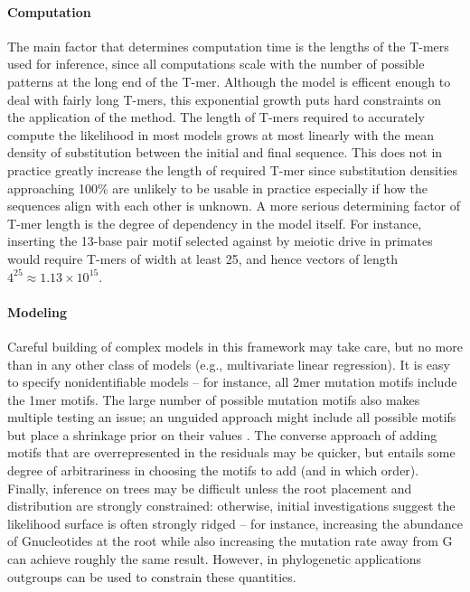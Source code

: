 \documentclass{article}
\newcommand{\nG}{\mbox{G}}
\theoremstyle{plain}
\theoremstyle{definition}
\begin{document}
\paragraph{Computation}
The main factor that determines computation time
is the lengths of the T-mers used for inference,
since all computations scale with the number of possible patterns at the long end of the T-mer.
Although the model is efficent enough to deal with fairly long T-mers,
this exponential growth puts hard constraints on the application of the method.
The length of T-mers required to accurately compute the likelihood in most models grows at most linearly
with the mean density of substitution between the initial and final sequence.
This does not in practice greatly increase the length of required T-mer 
since substitution densities approaching 100\% are unlikely to be usable in practice
especially if how the sequences align with each other is unknown.
A more serious determining factor of T-mer length is the degree of dependency in the model itself.
For instance, inserting the 13-base pair motif selected against by meiotic drive in primates \citep{myers2010drive}
would require T-mers of width at least 25, and hence vectors of length $4^25 \approx 1.13 \times 10^15$.


\paragraph{Modeling}
Careful building of complex models in this framework may take care,
but no more than in any other class of models (e.g., multivariate linear regression).
It is easy to specify nonidentifiable models -- 
for instance, all 2mer mutation motifs include the 1mer motifs.
The large number of possible mutation motifs also makes multiple testing an issue;
an unguided approach might include all possible motifs but place a shrinkage prior on their values \citep{shrinkage,horseshoe}.
The converse approach of adding motifs that are overrepresented in the residuals
may be quicker, but entails some degree of arbitrariness in choosing the motifs to add (and in which order).
Finally, inference on trees may be difficult unless the root placement and distribution are strongly constrained:
otherwise, initial investigations suggest the likelihood surface is often strongly ridged --
for instance, increasing the abundance of \nG nucleotides at the root while also increasing the mutation rate away from \nG
can achieve roughly the same result.
However, in phylogenetic applications outgroups can be used to constrain these quantities.
\end{document}
